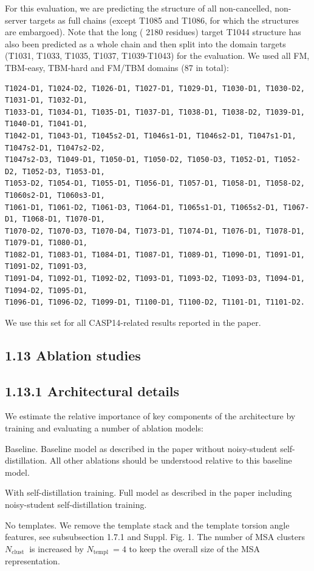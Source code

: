 \documentclass[10pt]{article}
\begin{document}
For this evaluation, we are predicting the structure of all non-cancelled, non-server targets as full chains (except T1085 and T1086, for which the structures are embargoed). Note that the long ( 2180 residues) target T1044 structure has also been predicted as a whole chain and then split into the domain targets (T1031, T1033, T1035, T1037, T1039-T1043) for the evaluation. We used all FM, TBM-easy, TBM-hard and FM/TBM domains (87 in total):

\begin{verbatim}
T1024-D1, T1024-D2, T1026-D1, T1027-D1, T1029-D1, T1030-D1, T1030-D2, T1031-D1, T1032-D1,
T1033-D1, T1034-D1, T1035-D1, T1037-D1, T1038-D1, T1038-D2, T1039-D1, T1040-D1, T1041-D1,
T1042-D1, T1043-D1, T1045s2-D1, T1046s1-D1, T1046s2-D1, T1047s1-D1, T1047s2-D1, T1047s2-D2,
T1047s2-D3, T1049-D1, T1050-D1, T1050-D2, T1050-D3, T1052-D1, T1052-D2, T1052-D3, T1053-D1,
T1053-D2, T1054-D1, T1055-D1, T1056-D1, T1057-D1, T1058-D1, T1058-D2, T1060s2-D1, T1060s3-D1,
T1061-D1, T1061-D2, T1061-D3, T1064-D1, T1065s1-D1, T1065s2-D1, T1067-D1, T1068-D1, T1070-D1,
T1070-D2, T1070-D3, T1070-D4, T1073-D1, T1074-D1, T1076-D1, T1078-D1, T1079-D1, T1080-D1,
T1082-D1, T1083-D1, T1084-D1, T1087-D1, T1089-D1, T1090-D1, T1091-D1, T1091-D2, T1091-D3,
T1091-D4, T1092-D1, T1092-D2, T1093-D1, T1093-D2, T1093-D3, T1094-D1, T1094-D2, T1095-D1,
T1096-D1, T1096-D2, T1099-D1, T1100-D1, T1100-D2, T1101-D1, T1101-D2.
\end{verbatim}

We use this set for all CASP14-related results reported in the paper.

\subsection*{1.13 Ablation studies}
\subsection*{1.13.1 Architectural details}
We estimate the relative importance of key components of the architecture by training and evaluating a number of ablation models:

Baseline. Baseline model as described in the paper without noisy-student self-distillation. All other ablations should be understood relative to this baseline model.

With self-distillation training. Full model as described in the paper including noisy-student self-distillation training.

No templates. We remove the template stack and the template torsion angle features, see subsubsection 1.7.1 and Suppl. Fig. 1. The number of MSA clusters $N_{\text {clust }}$ is increased by $N_{\text {templ }}=4$ to keep the overall size of the MSA representation.
\end{document}
